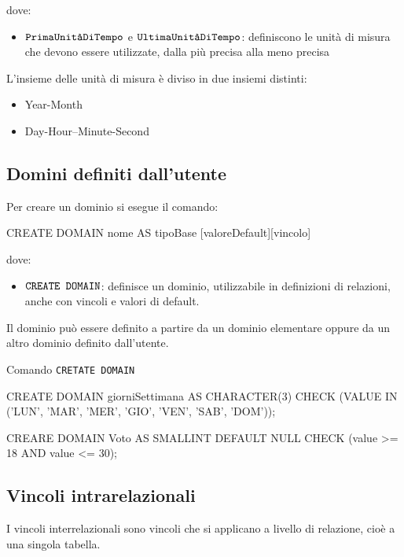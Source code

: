   dove:
  \begin{itemize}[label=$\triangleright$]
    \item $\verb|PrimaUnitàDiTempo|$ e $\verb|UltimaUnitàDiTempo|$: definiscono le unità di misura che devono essere utilizzate, dalla più precisa alla meno precisa
  \end{itemize}

  L'insieme delle unità di misura è diviso in due insiemi distinti:
  \begin{itemize}
    \item Year-Month
    \item Day-Hour–Minute-Second
  \end{itemize}

  \subsection{Domini definiti dall'utente}
  Per creare un dominio si esegue il comando:
  \begin{sqlcode}
    CREATE DOMAIN nome AS tipoBase [valoreDefault][vincolo]
  \end{sqlcode}

  dove:
  \begin{itemize}[label=$\triangleright$]
    \item $\verb|CREATE DOMAIN|$: definisce un dominio, utilizzabile in definizioni di relazioni, anche con vincoli e valori di default.
  \end{itemize}

  Il dominio può essere definito a partire da un dominio elementare oppure da un altro dominio definito dall'utente.

  \begin{esempiobox}{Comando \texttt{CRETATE DOMAIN}}
    \begin{sqlcode}
      CREATE DOMAIN giorniSettimana AS CHARACTER(3)
        CHECK (VALUE IN ('LUN', 'MAR', 'MER', 'GIO', 'VEN', 'SAB', 'DOM'));

      CREARE DOMAIN Voto AS SMALLINT DEFAULT NULL
        CHECK (value >= 18 AND value <= 30);
    \end{sqlcode}
  \end{esempiobox}

  \subsection{Vincoli intrarelazionali}
  I vincoli interrelazionali sono vincoli che si applicano a livello di relazione, cioè a una singola tabella.

